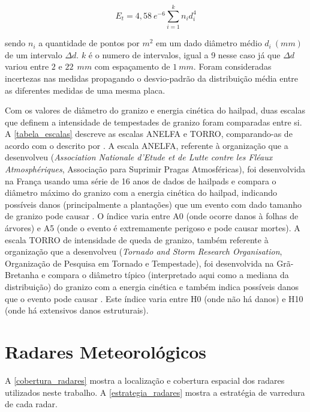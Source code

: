 \begin{equation}
	E_t = 4,58\:e^{-6} \sum_{i=1}^{k} n_i d_i^4
\end{equation}

\noindent
sendo $n_i$ a quantidade de pontos por $m^2$ em um dado diâmetro médio $d_i\:(mm)$ de um intervalo $\Delta d$. $k$ é o numero de intervalos, igual a 9 nesse caso já que $\Delta d$ variou entre $2$ e $22\:\:mm$ com espaçamento de $1\:mm$. Foram consideradas incertezas nas medidas propagando o desvio-padrão da distribuição média entre as diferentes medidas de uma mesma placa.

Com os valores de diâmetro do granizo e energia cinética do hailpad, duas escalas que definem a intensidade de tempestades de granizo foram comparadas entre si. A \autoref{tabela_escalas} descreve as escalas ANELFA e TORRO, comparando-as de acordo com o descrito por . A escala ANELFA, referente à organização que a desenvolveu (\textit{Association Nationale d'Etude et de Lutte contre les Fléaux Atmosphériques}, Associação para Suprimir Pragas Atmosféricas), foi desenvolvida na França usando uma série de 16 anos de dados de hailpads e compara o diâmetro máximo do granizo com a energia cinética do hailpad, indicando possíveis danos (principalmente a plantações) que um evento com dado tamanho de granizo pode causar \cite{Dessens2007}. O índice varia entre A0 (onde ocorre danos à folhas de árvores) e A5 (onde o evento é extremamente perigoso e pode causar mortes). A escala TORRO de intensidade de queda de granizo, também referente à organização que a desenvolveu (\textit{Tornado and Storm Research Organisation}, Organização de Pesquisa em Tornado e Tempestade), foi desenvolvida na Grã-Bretanha e compara o diâmetro típico (interpretado aqui como a mediana da distribuição) do granizo com a energia cinética e também indica possíveis danos que o evento pode causar \cite{webb1986}. Este índice varia entre H0 (onde não há danos) e H10 (onde há extensivos danos estruturais).



\section{Radares Meteorológicos}\label{radar}

A \autoref{cobertura_radares} mostra a localização e cobertura espacial dos radares utilizados neste trabalho. A \autoref{estrategia_radares} mostra a estratégia de varredura de cada radar.

